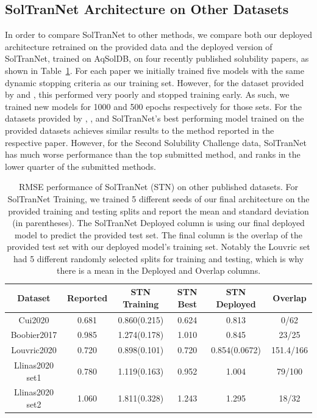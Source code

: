 \documentclass[journal=jmcmar,manuscript=article]{achemso}
\begin{document}
\subsection{SolTranNet Architecture on Other Datasets}

In order to compare SolTranNet to other methods, we compare both our deployed architecture retrained on the provided data and the deployed version of SolTranNet, trained on AqSolDB, on four recently published solubility papers, as shown in Table~\ref{tab:othersetsrmse}.
For each paper we initially trained five models with the same dynamic stopping criteria as our training set.
However, for the dataset provided by \citet{lovric} and \citet{boobier}, this performed very poorly and stopped training early.
As such, we trained new models for 1000 and 500 epochs respectively for those sets.
For the datasets provided by \citet{cui}, \citet{lovric}, and \citet{boobier} SolTranNet's best performing model trained on the provided datasets achieves similar results to the method reported in the respective paper.
However, for the Second Solubility Challenge data\cite{llinas}, SolTranNet has much worse performance than the top submitted method, and ranks in the lower quarter of the submitted methods.

\begin{table}
    \centering
    \begin{tabular}{|c|c|c|c|c|c|}
        \hline
        Dataset &  Reported & STN Training &  STN Best & STN Deployed & Overlap \\
        \hline
        Cui2020 & 0.681 & 0.860(0.215) & 0.624 & 0.813 & 0/62 \\
        Boobier2017 & 0.985 & 1.274(0.178) & 1.010 & 0.845 & 23/25 \\
        Louvric2020 & 0.720 & 0.898(0.101) & 0.720 & 0.854(0.0672) & 151.4/166 \\
        Llinas2020 set1 & 0.780 & 1.119(0.163) & 0.952 & 1.004 & 79/100 \\
        Llinas2020 set2 & 1.060 & 1.811(0.328) & 1.243 & 1.295 & 18/32 \\
        \hline
    \end{tabular}
    \caption{RMSE performance of SolTranNet (STN) on other published datasets. For SolTranNet Training, we trained 5 different seeds of our final architecture on the provided training and testing splits and report the mean and standard deviation (in parentheses). The SolTranNet Deployed column is using our final deployed model to predict the provided test set. The final column is the overlap of the provided test set with our deployed model's training set. Notably the Louvric set had 5 different randomly selected splits for training and testing, which is why there is a mean in the Deployed and Overlap columns.}
    \label{tab:othersetsrmse}
\end{table}
\end{document}
